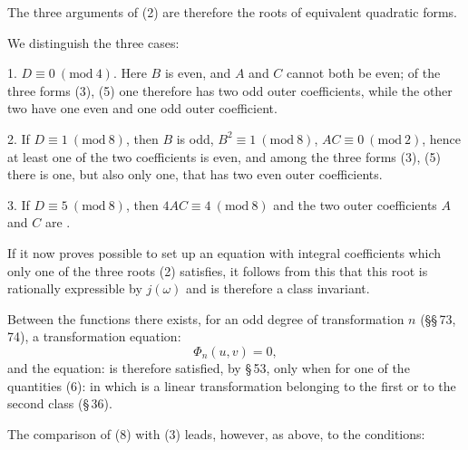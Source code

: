 The three arguments of (2) are therefore the roots of equivalent quadratic forms.

We distinguish the three cases:

1. $D\equiv 0\ (\mathrm{mod}\ 4)$. Here $B$ is even, and $A$ and $C$ cannot both be even; of the three forms (3), (5) one therefore has two odd outer coefficients, while the other two have one even and one odd outer coefficient.

2. If $D\equiv 1\ (\mathrm{mod}\ 8)$, then $B$ is odd, $B^2\equiv 1\ (\mathrm{mod}\ 8)$, $AC\equiv 0\ (\mathrm{mod}\ 2)$, hence at least one of the two coefficients is even, and among the three forms (3), (5) there is one, but also only one, that has two even outer coefficients.

3. If $D\equiv 5\ (\mathrm{mod}\ 8)$, then $4AC\equiv 4\ (\mathrm{mod}\ 8)$ and the two outer coefficients $A$ and $C$ are .

If it now proves possible to set up an equation with integral coefficients which only one of the three roots (2) satisfies, it follows from this that this  root is rationally expressible by $j(\omega)$ and is therefore a class invariant.

Between the functions
there exists, for an odd degree of transformation $n$ (\S\S\,73, 74), a transformation equation:
\[
\Phi_n(u,v) = 0,
\]
and the equation:
is therefore satisfied, by \S\,53, only when for one of the quantities (6):
in which
is a linear transformation belonging to the first or to the second class (\S\,36).

The comparison of (8) with (3) leads, however, as above, to the conditions:
